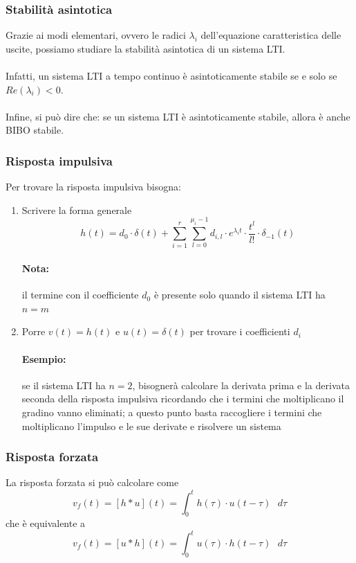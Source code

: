 \documentclass[a4paper]{article}
\begin{document}
	\subsubsection{Stabilità asintotica}
	Grazie ai modi elementari, ovvero le radici $\lambda_i$ dell'equazione caratteristica delle uscite,
	possiamo studiare la stabilità asintotica di un sistema LTI.
	\\ \\
	Infatti, un sistema LTI a tempo continuo è asintoticamente stabile se e solo se $Re(\lambda_i)<0$.
	\\ \\
	Infine, si può dire che: se un sistema LTI è asintoticamente stabile, allora è anche BIBO stabile.
	
	\subsubsection{Risposta impulsiva}
	Per trovare la risposta impulsiva bisogna:
	
	\begin{enumerate}
		\item Scrivere la forma generale
			\[ h(t) = d_0 \cdot \delta(t) + \sum_{i=1}^r \sum_{l=0}^{\mu_i-1} d_{i,l} \cdot e^{\lambda_it} \cdot \frac{t^l}{l!} \cdot \delta_{-1}(t) \]
			\paragraph{Nota:}
			il termine con il coefficiente $d_0$ è presente solo quando il sistema LTI ha $n = m$
		\item Porre $v(t) = h(t)$ e $u(t) = \delta(t)$ per trovare i coefficienti $d_i$
			\paragraph{Esempio:}
			se il sistema LTI ha $n=2$, bisognerà calcolare la derivata prima e la derivata seconda della risposta impulsiva
			ricordando che i termini che moltiplicano il gradino vanno eliminati; a questo punto basta raccogliere i termini
			che moltiplicano l'impulso e le sue derivate e risolvere un sistema
	\end{enumerate}
	
	\subsubsection{Risposta forzata}
	La risposta forzata si può calcolare come
	\[ v_f(t) = [h*u](t) = \int_{0}^t h(\tau) \cdot u(t-\tau) \text{ } d\tau \]
	che è equivalente a
	\[ v_f(t) = [u*h](t) = \int_{0}^t u(\tau) \cdot h(t-\tau) \text{ } d\tau \]
	
\end{document}
